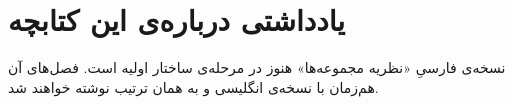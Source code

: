 \chapter*{یادداشتی درباره‌ی این کتابچه}

نسخه‌ی فارسیِ «نظریه مجموعه‌ها» هنوز در مرحله‌ی ساختار اولیه است. فصل‌های آن هم‌زمان با نسخه‌ی انگلیسی و به همان ترتیب نوشته خواهند شد.
